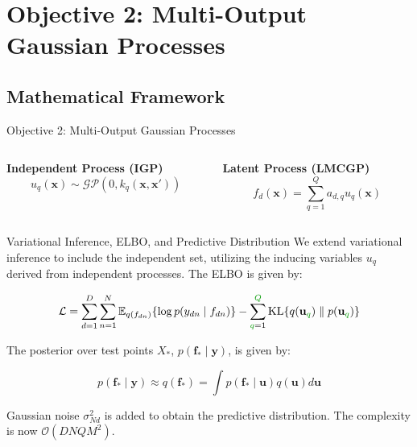 \section*{Objective 2: Multi-Output Gaussian Processes}

\subsection{Mathematical Framework}


\begin{frame}{Objective 2: Multi-Output Gaussian Processes}
	\centering
	\setlength{} 
	\setlength{}
	
	
	\begin{columns}[T] %

		\begin{column}{0.5\textwidth}
			\centering
	\textcolor{mygreen}{
		\textbf{Independent Process (IGP)}
		\begin{equation*}
			u_{q}(\mathbf{x}) \sim \mathcal{GP}(0, k_{q}(\mathbf{x}, \mathbf{x}'))
		\end{equation*}
	}
	\end{column}
	
	
	\begin{column}{0.5\textwidth}
		\centering
		\textcolor{myblue}{
			\textbf{Latent Process (LMCGP)}
			\begin{equation*}
				f_{d}(\mathbf{x}) = \sum_{q=1}^Q a_{d,q} u_{q}(\mathbf{x})
			\end{equation*}	
		}
	\end{column}
	
	\end{columns}
\end{frame}


\begin{frame}{Variational Inference, ELBO, and Predictive Distribution}
	We extend variational inference to include the independent set, utilizing the inducing variables $u_q$ derived from independent processes. The ELBO is given by:
	
	\begin{equation*}\label{eq:lmc_elbo}
		\mathcal{L} = \sum_{d=1}^D\sum_{n=1}^{N} \mathbb{E}_{q(f_{dn})}\{\log p(y_{dn} \mid f_{dn})\} - \sum_{{\textcolor{mygreen}{q}}=1}^{\textcolor{mygreen}{Q}} \text{KL}\{q(\mathbf{u}_{\textcolor{mygreen}{q}})\parallel p(\mathbf{u}_{\textcolor{mygreen}{q}})\}
	\end{equation*}
	
	The posterior over test points $X_*$, $p(\mathbf{f}_* \mid \mathbf{y})$, is given by:
	
	\begin{equation*}
		p(\mathbf{f}_* \mid \mathbf{y}) \approx q(\mathbf{f}_*) = \int p(\mathbf{f}_* \mid \mathbf{u}) q(\mathbf{u}) d \mathbf{u}
	\end{equation*}
	
	Gaussian noise $\sigma_{Nd}^2$ is added to obtain the predictive distribution. The complexity is now \textcolor{mygreen}{$\mathcal{O}(DNQM^2)$}.
\end{frame}

